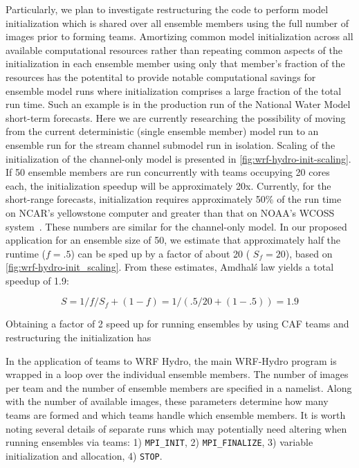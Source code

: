 Particularly, we plan to investigate restructuring the code to perform
model initialization which is shared over all ensemble members using
the full number of images prior to forming teams. Amortizing common
model initialization across all available computational resources
rather than repeating common aspects of the initialization in each
ensemble member using only that member's fraction of the resources has
the potentital to provide notable computational savings for
ensemble model runs where initialization comprises a large fraction of
the total run time. Such an example is in the production run of the
National Water Model short-term forecasts. Here we are currently
researching the possibility of moving from the current deterministic
(single ensemble member) model run to an ensemble run for the stream
channel submodel run in isolation. Scaling of the
initialization of the channel-only model is presented in
\ref{fig:wrf-hydro-init-scaling}. If 50 ensemble members are run concurrently with
teams occupying 20 cores each, the initialization speedup will be
approximately 20x. Currently, for the short-range forecasts, 
initialization requires approximately 50\% of the run time on
NCAR's yellowstone computer and greater than that on NOAA's WCOSS
system~\cite{yuetal2017}. These numbers are
similar for the channel-only model. In our proposed application for an ensemble size of 50, we estimate that
approximately half the runtime ($f=.5$) can be sped up by a factor of
about 20 ( $S_f=20$), based on \ref{fig:wrf-hydro-init_scaling}. From
these estimates, Amdhal\'s law yields a total speedup
of 1.9:

\begin{equation}
S = 1 / { f/S_f + (1-f) } = 1 / (.5/20 + (1-.5)) = 1.9
\end{equation}

Obtaining a factor of 2 speed up for running ensembles by using CAF
teams and restructuring the initialization has   

In the application of teams to WRF Hydro, the main WRF-Hydro program is wrapped in a loop
over the individual ensemble members. The number of images per team and the
 number of ensemble members are specified in a namelist. Along with
 the number of available images, these parameters determine how many
 teams are formed and which teams handle which ensemble members. It is
 worth noting several details of separate runs which may potentially need altering
 when running ensembles via teams: 1) \texttt{MPI\_INIT}, 2) \texttt{MPI\_FINALIZE}, 3)
 variable initialization and allocation, 4) \texttt{STOP}.


